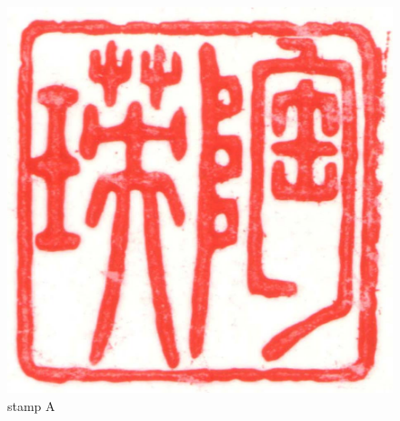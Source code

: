 \documentclass[
  letterpaper,
  DIV=11,
  numbers=noendperiod]{scrartcl}
\begin{document}
\begin{figure}

{\centering \includegraphics{stamp1a.jpg}

}

\caption{\label{fig-stamp1a}stamp A}

\end{figure}
\end{document}
